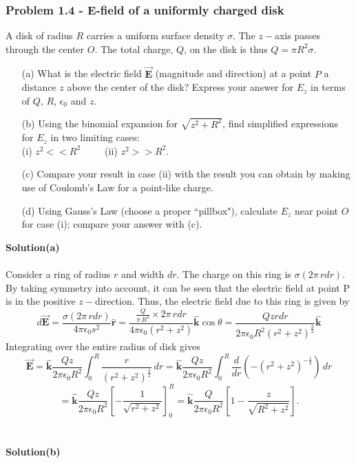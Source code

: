 \documentclass{article}
\begin{document}
\subsubsection*{Problem 1.4 - E-field of a uniformly charged disk}
A disk of radius $R$ carries a uniform surface density $\sigma$. The $z-$axis passes through the center $O$. The total charge, $Q$, on the disk is thus $Q=\pi R^2\sigma$.
\begin{enumerate}
\item[(a)]What is the electric field $\Vec{\boldsymbol{E}}$ (magnitude and direction) at a point $P$ a distance $z$ above the center of the disk? Express your answer for $E_z$ in terms of $Q$, $R$, $\epsilon_0$ and $z$.
\item[(b)]Using the binomial expansion for $\sqrt{z^2+R^2}$, find simplified expressions for $E_z$ in two limiting cases:
\\(i) $z^2<<R^2$\,\,\,\,\,\,\,\,\,\,\,\,\,\,\,(ii) $z^2>>R^2$.
\item[(c)]Compare your result in case (ii) with the result you can obtain by making use of Coulomb's Law for a point-like charge.
\item[(d)]Using Gauss's Law (choose a proper “pillbox"), calculate $E_z$ near point $O$ for case (i); compare your answer with (c).
\end{enumerate}
\textbf{Solution(a)}
\\
\\Consider a ring of radius $r$ and width $dr$. The charge on this ring is $\sigma(2\pi\,rdr)$. By taking symmetry into account, it can be seen that the electric field at point P is in the positive $z-$direction. Thus, the electric field due to this ring is given by
\[d\Vec{\boldsymbol{E}}=\frac{\sigma(2\pi\,rdr)}{4\pi\epsilon_0s^2}\boldsymbol{\hat{r}}=\frac{\frac{Q}{\pi\,R^2}\times2\pi\,rdr}{4\pi\epsilon_0\left(r^2+z^2\right)}\boldsymbol{\hat{k}}\cos\theta=\frac{Qzrdr}{2\pi\epsilon_0R^2\left(r^2+z^2\right)^{\frac{3}{2}}}\boldsymbol{\hat{k}}\]
Integrating over the entire radius of disk gives
\[\Vec{\boldsymbol{E}}=\boldsymbol{\hat{k}}\frac{Qz}{2\pi\epsilon_0R^2}\int_{0}^{R}\frac{r}{\left(r^2+z^2\right)^{\frac{3}{2}}}\,dr=\boldsymbol{\hat{k}}\frac{Qz}{2\pi\epsilon_0R^2}\int_{0}^{R}\frac{d}{dr}\left(-\left(r^2+z^2\right)^{-\frac{1}{2}}\right)\,dr\]
\[=\boldsymbol{\hat{k}}\frac{Qz}{2\pi\epsilon_0R^2}\left[-\frac{1}{\sqrt{r^2+z^2}}\right]_{0}^{R}=\boldsymbol{\hat{k}}\frac{Q}{2\pi\epsilon_0R^2}\left[1-\frac{z}{\sqrt{R^2+z^2}}\right].\]
\\
\\\textbf{Solution(b)}
\end{document}

